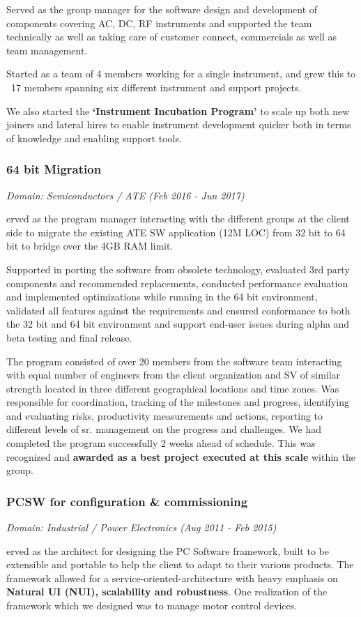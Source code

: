 \documentclass[a4paper,12pt]{article}
\newcommand\cvprojectentry[5]{
  \subsubsection*{#1}
  
  \vspace{-7pt}
  
  \it{Domain: #2}\normalfont{} \quad (#3 - #4)
  
}
\begin{document}
{Served as the group manager for the software design and development of
components covering AC, DC, RF instruments and supported the team
technically as well as taking care of customer connect, commercials as
well as team management.
  
Started as a team of 4 members working for a single instrument, and
grew this to ~17 members spanning six different instrument and support
projects.

We also started the \textbf{`Instrument Incubation Program'} to scale
up both new joiners and lateral hires to enable instrument development
quicker both in terms of knowledge and enabling support tools.


}


\cvprojectentry{64 bit Migration}{Semiconductors / ATE}{Feb 2016}{Jun 2017}

Served as the program manager interacting with the different groups at
the client side to migrate the existing ATE SW application (12M LOC)
from 32 bit to 64 bit to bridge over the 4GB RAM limit.

Supported in porting the software from obsolete technology, evaluated
3rd party components and recommended replacements, conducted
performance evaluation and implemented optimizations while running in
the 64 bit environment, validated all features against the
requirements and ensured conformance to both the 32 bit and 64 bit
environment and support end-user issues during alpha and beta testing
and final release.
 
The program consisted of over 20 members from the software team
interacting with equal number of engineers from the client
organization and SV of similar strength located in three different
geographical locations and time zones. Was responsible for
coordination, tracking of the milestones and progress, identifying and
evaluating risks, productivity measurements and actions, reporting to
different levels of sr. management on the progress and challenges. We
had completed the program successfully 2 weeks ahead of schedule. This
was recognized and \textbf{awarded as a best project executed at this
scale} within the group.

\cvprojectentry{PCSW for configuration \& commissioning}{Industrial / Power Electronics}{Aug 2011}{Feb 2015}

Served as the architect for designing the PC Software framework, built
to be extensible and portable to help the client to adapt to their
various products. The framework allowed for a
service-oriented-architecture with heavy emphasis on \textbf{Natural
  UI (NUI), scalability and robustness}. One realization of the
framework which we designed was to manage motor control devices.
 
\end{document}
